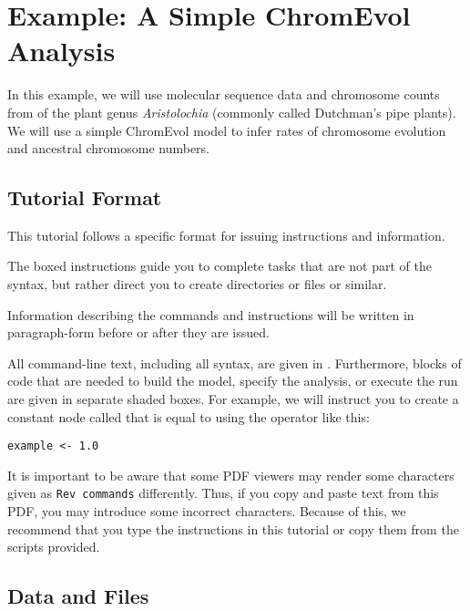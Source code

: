 \section{Example: A Simple ChromEvol Analysis}\label{sec:chromo_basic_analysis}

In this example, we will use molecular sequence data and chromosome counts from \citet{ohi2006molecular} of the plant genus \textit{Aristolochia} (commonly called Dutchman's pipe plants). 
We will use a simple ChromEvol model to infer rates of chromosome evolution and ancestral chromosome numbers.

\medskip
\subsection{Tutorial Format}\label{subsect:Exercise-Format}

This tutorial follows a specific format for issuing instructions and information.

{\begin{framed}
The boxed instructions guide you to complete tasks that are not part of the \RevBayes syntax, but rather direct you to create directories or files or similar.
\end{framed}}


Information describing the commands and instructions will be written in paragraph-form before or after they are issued.

All command-line text, including all \Rev syntax, are given in . 
Furthermore, blocks of \Rev code that are needed to build the model, specify the analysis, or execute the run are given in separate shaded boxes.
For example, we will instruct you to create a constant node called  that is equal to  using the \cl{<-} operator like this:
{\tt \begin{snugshade*}
\begin{lstlisting}
example <- 1.0
\end{lstlisting}
\end{snugshade*}
}

It is important to be aware that some PDF viewers may render some characters given as \colorbox{shadecolor}{\tt{Rev commands}} differently. 
Thus, if you copy and paste text from this PDF, you may introduce some incorrect characters. 
Because of this, we recommend that you type the instructions in this tutorial or copy them from the scripts provided. 


\medskip
\subsection{Data and Files}\label{subsect:Exercise-DataFiles}

